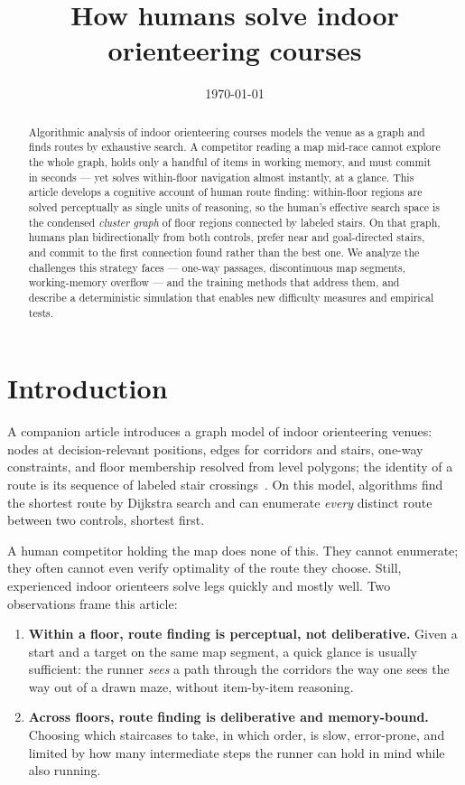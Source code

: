 \documentclass[11pt,a4paper,twocolumn]{article}
\title{How humans solve indoor orienteering courses}
\author{}
\date{\today}
\begin{document}
\maketitle

\begin{abstract}
Algorithmic analysis of indoor orienteering courses models the venue as a
graph and finds routes by exhaustive search. A competitor reading a map
mid-race cannot explore the whole graph, holds only a handful of items in
working memory, and must commit in seconds --- yet solves within-floor
navigation almost instantly, at a glance. This article develops a cognitive
account of human route finding: within-floor regions are solved perceptually
as single units of reasoning, so the human's effective search space is the
condensed \emph{cluster graph} of floor regions connected by labeled stairs.
On that graph, humans plan bidirectionally from both controls, prefer near
and goal-directed stairs, and commit to the first connection found rather
than the best one. We analyze the challenges this strategy faces --- one-way
passages, discontinuous map segments, working-memory overflow --- and the
training methods that address them, and describe a deterministic simulation
that enables new difficulty measures and empirical tests.
\end{abstract}

\section{Introduction}

A companion article introduces a graph model of indoor orienteering venues:
nodes at decision-relevant positions, edges for corridors and stairs, one-way
constraints, and floor membership resolved from level polygons; the identity
of a route is its sequence of labeled stair crossings~\cite{framework}. On
this model, algorithms find the shortest route by Dijkstra search and can
enumerate \emph{every} distinct route between two controls, shortest first.

A human competitor holding the map does none of this. They cannot enumerate;
they often cannot even verify optimality of the route they choose. Still,
experienced indoor orienteers solve legs quickly and mostly well. Two
observations frame this article:

\begin{enumerate}
    \item \textbf{Within a floor, route finding is perceptual, not
          deliberative.} Given a start and a target on the same map segment,
          a quick glance is usually sufficient: the runner \emph{sees} a
          path through the corridors the way one sees the way out of a
          drawn maze, without item-by-item reasoning.
    \item \textbf{Across floors, route finding is deliberative and
          memory-bound.} Choosing which staircases to take, in which order,
          is slow, error-prone, and limited by how many intermediate steps
          the runner can hold in mind while also running.
\end{enumerate}
\end{document}

